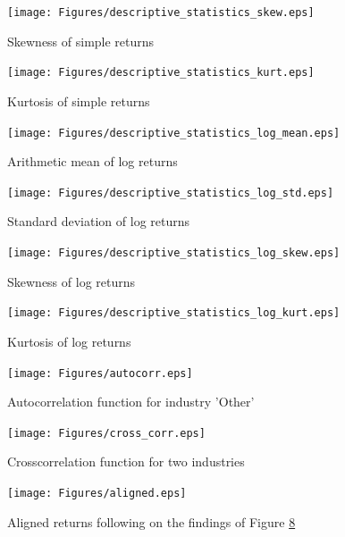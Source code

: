 \documentclass[a4paper]{article}
\begin{document}
\begin{figure}[htbp]
	\centering
	\texttt{[image: Figures/descriptive\_statistics\_skew.eps]}
	\caption{Skewness of simple returns}
	\label{simple_skew}
\end{figure}

\begin{figure}[htbp]
	\centering
	\texttt{[image: Figures/descriptive\_statistics\_kurt.eps]}
	\caption{Kurtosis of simple returns}
	\label{simple_kurt}
\end{figure}

\begin{figure}[htbp]
	\centering
	\texttt{[image: Figures/descriptive\_statistics\_log\_mean.eps]}
	\caption{Arithmetic mean of log returns}
	\label{log_means}
\end{figure}

\begin{figure}[htbp]
	\centering
	\texttt{[image: Figures/descriptive\_statistics\_log\_std.eps]}
	\caption{Standard deviation of log returns}
	\label{log_std}
\end{figure}

\begin{figure}[htbp]
	\centering
	\texttt{[image: Figures/descriptive\_statistics\_log\_skew.eps]}
	\caption{Skewness of log returns}
	\label{log_skew}
\end{figure}

\begin{figure}[htbp]
	\centering
	\texttt{[image: Figures/descriptive\_statistics\_log\_kurt.eps]}
	\caption{Kurtosis of log returns}
	\label{log_kurt}
\end{figure}

\begin{figure}[htbp]
	\centering
	\texttt{[image: Figures/autocorr.eps]}
	\caption{Autocorrelation function for industry 'Other'}
	\label{autocorr}
\end{figure}

\begin{figure}[htbp]
	\centering
	\texttt{[image: Figures/cross\_corr.eps]}
	\caption{Crosscorrelation function for two industries}
	\label{crosscorr}
\end{figure}

\begin{figure}[htbp]
	\centering
	\texttt{[image: Figures/aligned.eps]}
	\caption{Aligned returns following on the findings of Figure \ref{crosscorr}}
	\label{aligned}
\end{figure}
\end{document}
